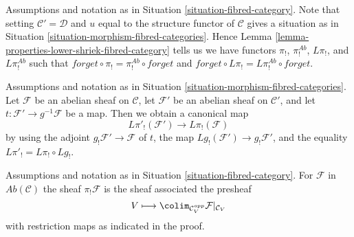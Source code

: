 \begin{remark}
\label{remark-fibred-category}
Assumptions and notation as in Situation \ref{situation-fibred-category}.
Note that setting $\mathcal{C}' = \mathcal{D}$ and $u$ equal to the
structure functor of $\mathcal{C}$ gives a situation as in
Situation \ref{situation-morphism-fibred-categories}. Hence
Lemma \ref{lemma-properties-lower-shriek-fibred-category}
tells us we have functors  $\pi_!$, $\pi_!^{\textit{Ab}}$, $L\pi_!$, and
$L\pi_!^{\textit{Ab}}$ such that
$forget \circ \pi_! = \pi_!^{\textit{Ab}} \circ forget$ and
$forget \circ L\pi_! = L\pi_!^{\textit{Ab}} \circ forget$.
\end{remark}

\begin{remark}
\label{remark-morphism-fibred-categories}
Assumptions and notation as in
Situation \ref{situation-morphism-fibred-categories}.
Let $\mathcal{F}$ be an abelian sheaf on $\mathcal{C}$,
let $\mathcal{F}'$ be an abelian sheaf on $\mathcal{C}'$,
and let $t : \mathcal{F}' \to g^{-1}\mathcal{F}$ be a map.
Then we obtain a canonical map
$$
L\pi'_!(\mathcal{F}') \longrightarrow L\pi_!(\mathcal{F})
$$
by using the adjoint $g_!\mathcal{F}' \to \mathcal{F}$ of $t$,
the map $Lg_!(\mathcal{F}') \to g_!\mathcal{F}'$, and the
equality $L\pi'_! = L\pi_! \circ Lg_!$.
\end{remark}

\begin{lemma}
\label{lemma-compute-pi-shriek}
Assumptions and notation as in
Situation \ref{situation-fibred-category}.
For $\mathcal{F}$ in $\textit{Ab}(\mathcal{C})$
the sheaf $\pi_!\mathcal{F}$ is the
sheaf associated the presheaf
$$
V \longmapsto \colim_{\mathcal{C}_V^{opp}} \mathcal{F}|_{\mathcal{C}_V}
$$
with restriction maps as indicated in the proof.
\end{lemma}

